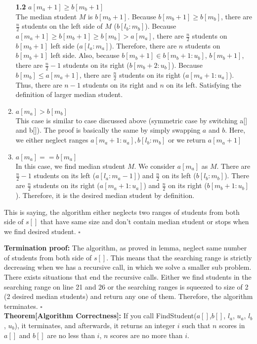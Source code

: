 \documentclass{article}
\begin{document}
\begin{enumerate}
            \textbf{1.2} $a[m_a+1]\geq b[m_b+1]$\\
            The median student $M$ is $b[m_b+1]$. Because $b[m_b+1] \geq b[m_b]$, there are $\frac{n}{2}$ students on the left side of $M$ ($b[l_b:m_b]$). Because $a[m_a+1]\geq b[m_b+1] \geq b[m_b] > a[m_a]$, there are $\frac{n}{2}$ students on $b[m_b+1]$ left side ($a[l_a:m_a]$). Therefore, there are $n$ students on  $b[m_b+1]$ left side. Also, because $b[m_b+1] \in b[m_b+1:u_b]$, $b[m_b+1]$, there are $\frac{n}{2}-1$ students on its right ($b[m_b+2:u_b]$). Because $b[m_b] \leq a[m_a+1]$, there are $\frac{n}{2}$ students on its right ($a[m_a+1:u_a]$). Thus, there are $n-1$ students on its right and $n$ on its left. Satisfying the definition of larger median student.  
        \item $a[m_a] > b[m_b]$\\
            This case is similar to case discussed above (symmetric case by switching a[] and b[]). The proof is basically the same by simply swapping $a$ and $b$. Here, we either neglect ranges $a[m_a+1:u_a], b[l_b:m_b]$ or we return $a[m_a+1]$
        \item $a[m_a] == b[m_a]$\\
            In this case, we find median student $M$. We consider $a[m_a]$ as $M$. There are $\frac{n}{2}-1$ students on its left ($a[l_a:m_a-1]$) and $\frac{n}{2}$ on its left ($b[l_b:m_b]$). There are $\frac{n}{2}$ students on its right ($a[m_a+1:u_a]$) and $\frac{n}{2}$ on its right ($b[m_b+1:u_b]$). Therefore, it is the desired median student by definition. 
\end{enumerate}
This is saying, the algorithm either neglects two ranges of students from both side of $s[]$ that have same size and don't contain median student or stops when we find desired student. $\square$

\textbf{Termination proof:} The algorithm, as proved in lemma, neglect same number of students from both side of $s[]$. This means that the searching range is strictly decreasing when we has a recursive call, in which we solve a smaller sub problem. There exists situations that end the recursive calls. Either we find students in the searching range on line 21 and 26 or the searching ranges is squeezed to size of 2 (2 desired median students) and return any one of them. Therefore, the algorithm terminates. $\square$ \\

\textbf{Theorem[Algorithm Correctness]:} If you call FindStudent($a[ ]$,$b[]$, $l_a$, $u_a$, $l_b$, $u_b$), it terminates, and afterwards, it returns an integer $i$ such that $n$ scores in $a[]$ and $b[]$ are no less than $i$, $n$ scores are no more than $i$.
\end{document}
